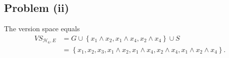 \subsection*{Problem (ii)}

The version space equals
\[
\begin{aligned}\mathit{VS}_{\mathcal{H}_{6},E} & =G\cup\left\{ x_{1}\land x_{2},x_{1}\land x_{4},x_{2}\land x_{4}\right\} \cup S\\
 & =\left\{ x_{1},x_{2},x_{3},x_{1}\land x_{2},x_{1}\land x_{4},x_{2}\land x_{4},x_{1}\land x_{2}\land x_{4}\right\} .
\end{aligned}
\]